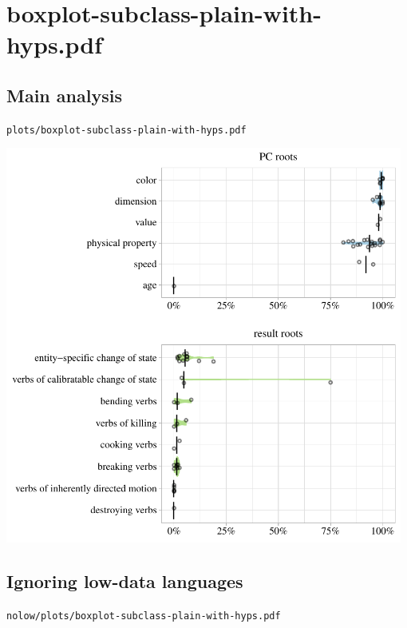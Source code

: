 \eject

\section{boxplot-subclass-plain-with-hyps.pdf}

\subsection{Main analysis}

\texttt{plots/boxplot-subclass-plain-with-hyps.pdf}

\includegraphics[width=0.98\textwidth]{../plots/boxplot-subclass-plain-with-hyps.pdf}

\subsection{Ignoring low-data languages}

\texttt{nolow/plots/boxplot-subclass-plain-with-hyps.pdf}

